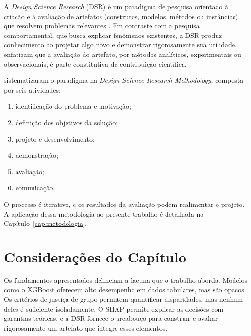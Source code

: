 A \textit{Design Science Research} (DSR) é um paradigma de pesquisa orientado à criação e à avaliação de artefatos (construtos, modelos, métodos ou instâncias) que resolvem problemas relevantes \cite{hevner2004design}. Em contraste com a pesquisa comportamental, que busca explicar fenômenos existentes, a DSR produz conhecimento ao projetar algo novo e demonstrar rigorosamente sua utilidade.  enfatizam que a avaliação do artefato, por métodos analíticos, experimentais ou observacionais, é parte constitutiva da contribuição científica.

 sistematizaram o paradigma na \textit{Design Science Research Methodology}, composta por seis atividades:
\begin{enumerate}
    \item identificação do problema e motivação;
    \item definição dos objetivos da solução;
    \item projeto e desenvolvimento;
    \item demonstração;
    \item avaliação;
    \item comunicação.
\end{enumerate}
O processo é iterativo, e os resultados da avaliação podem realimentar o projeto. A aplicação dessa metodologia ao presente trabalho é detalhada no Capítulo~\ref{cap:metodologia}.

\section{Considerações do Capítulo}

Os fundamentos apresentados delineiam a lacuna que o trabalho aborda. Modelos como o XGBoost oferecem alto desempenho em dados tabulares, mas são opacos. Os critérios de justiça de grupo permitem quantificar disparidades, mas nenhum deles é suficiente isoladamente. O SHAP permite explicar as decisões com garantias teóricas, e a DSR fornece o arcabouço para construir e avaliar rigorosamente um artefato que integre esses elementos.
